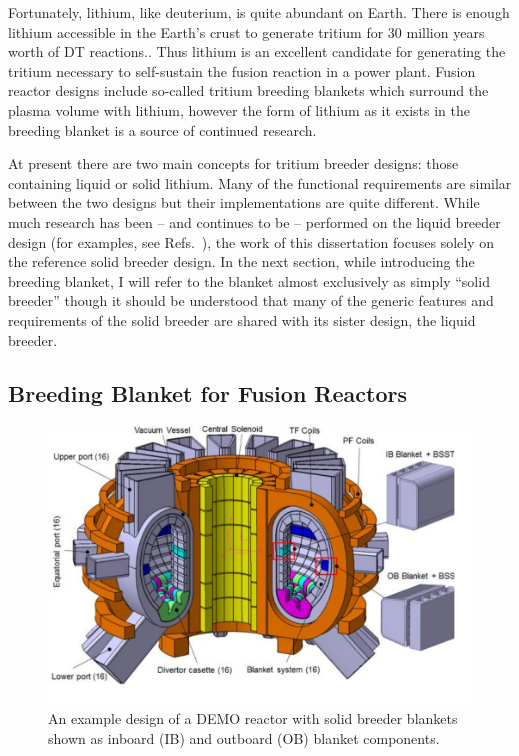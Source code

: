 Fortunately, lithium, like deuterium, is quite abundant on Earth. There is enough lithium accessible in the Earth's crust to generate tritium for 30 million years worth of DT reactions.\cite{Chen2011}. Thus lithium is an excellent candidate for generating the tritium necessary to self-sustain the fusion reaction in a power plant. Fusion reactor designs include so-called tritium breeding blankets which surround the plasma volume with lithium, however the form of lithium as it exists in the breeding blanket is a source of continued research.



At present there are two main concepts for tritium breeder designs: those containing liquid or solid lithium. Many of the functional requirements are similar between the two designs but their implementations are quite different. While much research has been -- and continues to be -- performed on the liquid breeder design (for examples, see Refs.~\cite{Hartmann1937,Hunt2006,Shercliff1953,Sommeria1982,Xv1937,Alfve1942}), the work of this dissertation focuses solely on the reference solid breeder design. In the next section, while introducing the breeding blanket, I will refer to the blanket almost exclusively as simply ``solid breeder'' though it should be understood that many of the generic features and requirements of the solid breeder are shared with its sister design, the liquid breeder.

\subsection{Breeding Blanket for Fusion Reactors}


\begin{figure}[ht]
	\centering
	\includegraphics[width=1\textwidth]{chapters/figures/demo} 
	\caption{An example design of a DEMO reactor with solid breeder blankets shown as inboard (IB) and outboard (OB) blanket components.}
	\label{fig:demo}
\end{figure}

